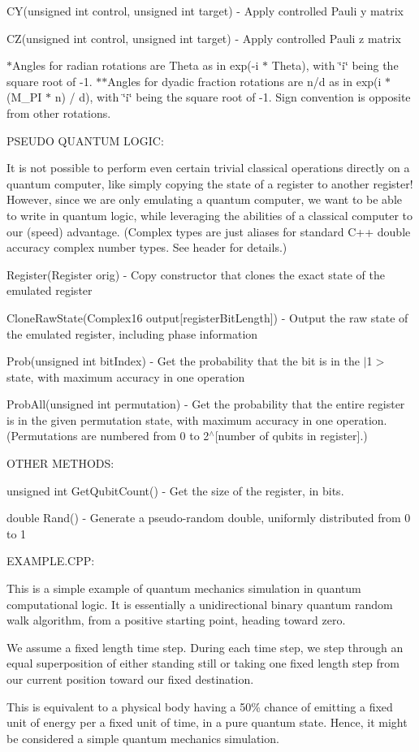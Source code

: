 C\+Y(unsigned int control, unsigned int target) -\/ Apply controlled Pauli y matrix

C\+Z(unsigned int control, unsigned int target) -\/ Apply controlled Pauli z matrix

$\ast$\+Angles for radian rotations are Theta as in exp(-\/i $\ast$ Theta), with \char`\"{}i\char`\"{} being the square root of -\/1. $\ast$$\ast$\+Angles for dyadic fraction rotations are n/d as in exp(i $\ast$ (M\+\_\+\+PI $\ast$ n) / d), with \char`\"{}i\char`\"{} being the square root of -\/1. Sign convention is opposite from other rotations.

P\+S\+E\+U\+DO Q\+U\+A\+N\+T\+UM L\+O\+G\+IC\+:

It is not possible to perform even certain trivial classical operations directly on a quantum computer, like simply copying the state of a register to another register! However, since we are only emulating a quantum computer, we want to be able to write in quantum logic, while leveraging the abilities of a classical computer to our (speed) advantage. (Complex types are just aliases for standard C++ double accuracy complex number types. See header for details.)

Register(\+Register orig) -\/ Copy constructor that clones the exact state of the emulated register

Clone\+Raw\+State(\+Complex16 output\mbox{[}register\+Bit\+Length\mbox{]}) -\/ Output the raw state of the emulated register, including phase information

Prob(unsigned int bit\+Index) -\/ Get the probability that the bit is in the $\vert$1$>$ state, with maximum accuracy in one operation

Prob\+All(unsigned int permutation) -\/ Get the probability that the entire register is in the given permutation state, with maximum accuracy in one operation. (Permutations are numbered from 0 to 2$^\wedge$\mbox{[}number of qubits in register\mbox{]}.)

O\+T\+H\+ER M\+E\+T\+H\+O\+DS\+:

unsigned int Get\+Qubit\+Count() -\/ Get the size of the register, in bits.

double Rand() -\/ Generate a pseudo-\/random double, uniformly distributed from 0 to 1

E\+X\+A\+M\+P\+L\+E.\+C\+PP\+:

This is a simple example of quantum mechanics simulation in quantum computational logic. It is essentially a unidirectional binary quantum random walk algorithm, from a positive starting point, heading toward zero.

We assume a fixed length time step. During each time step, we step through an equal superposition of either standing still or taking one fixed length step from our current position toward our fixed destination.

This is equivalent to a physical body having a 50\% chance of emitting a fixed unit of energy per a fixed unit of time, in a pure quantum state. Hence, it might be considered a simple quantum mechanics simulation. 